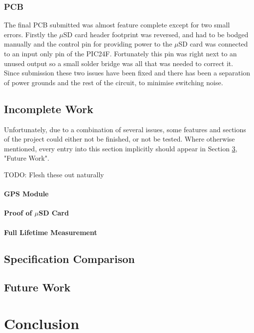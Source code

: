 \documentclass[12pt,openany,a4paper]{book}
\begin{document}
		\subsection{PCB}
		The final PCB submitted was almost feature complete except for two small errors. Firstly the $\mu$SD card header footprint was reversed, and had to be bodged manually and the control pin for providing power to the $\mu$SD card was connected to an input only pin of the PIC24F. Fortunately this pin was right next to an unused output so a small solder bridge was all that was needed to correct it. \\
		
		Since submission these two issues have been fixed and there has been a separation of power grounds and the rest of the circuit, to minimise switching noise. \\
		
	\section{Incomplete Work}
	Unfortunately, due to a combination of several issues, some features and sections of the project could either not be finished, or not be tested. Where otherwise mentioned, every entry into this section implicitly  should appear in Section \ref{sec:FUTURE}, "Future Work".
	
	TODO: Flesh these out naturally
	\subsubsection{GPS Module}
	\subsubsection{Proof of $\mu$SD Card}
	\subsubsection{Full Lifetime Measurement}
	
	\section{Specification Comparison}
	\section{Future Work} \label{sec:FUTURE}

\chapter{Conclusion}
\end{document}
